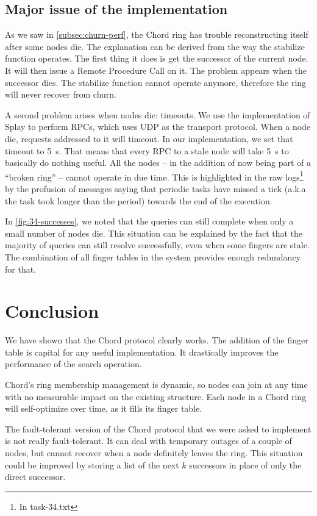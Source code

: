 \documentclass[11pt,a4paper,parskip=half]{scrartcl}
\begin{document}
\subsection{Major issue of the implementation}
\label{subsec:major-issue}

As we saw in \autoref{subsec:churn-perf}, the Chord ring has trouble reconstructing itself after some nodes die.
The explanation can be derived from the way the \textsf{stabilize} function operates.
The first thing it does is get the successor of the current node.
It will then issue a Remote Procedure Call on it.
The problem appears when the successor dies.
The \textsf{stabilize} function cannot operate anymore, therefore the ring will never recover from churn.

A second problem arises when nodes die: timeouts.
We use the implementation of Splay to perform RPCs, which uses UDP as the transport protocol.
When a node die, requests addressed to it will timeout.
In our implementation, we set that timeout to \SI{5}{s}.
That means that every RPC to a stale node will take \SI{5}{s} to basically do nothing useful.
All the nodes -- in the addition of now being part of a \enquote{broken ring} -- cannot operate in due time.
This is highlighted in the raw logs\footnote{In \textsf{task-34.txt}} by the profusion of messages saying that periodic tasks have missed a tick (a.k.a the task took longer than the period) towards the end of the execution.

In \autoref{fig:34-successes}, we noted that the queries can still complete when only a small number of nodes die.
This situation can be explained by the fact that the majority of queries can still resolve successfully, even when some fingers are stale.
The combination of all finger tables in the system provides enough redundancy for that.

\pagebreak
\section{Conclusion}

We have shown that the Chord protocol clearly works.
The addition of the finger table is capital for any useful implementation.
It drastically improves the performance of the search operation.

Chord's ring membership management is dynamic, so nodes can join at any time with no measurable impact on the existing structure.
Each node in a Chord ring will self-optimize over time, as it fills its finger table.

The fault-tolerant version of the Chord protocol that we were asked to implement is not really fault-tolerant.
It can deal with temporary outages of a couple of nodes, but cannot recover when a node definitely leaves the ring.
This situation could be improved by storing a list of the next $k$ successors in place of only the direct successor.
\end{document}
